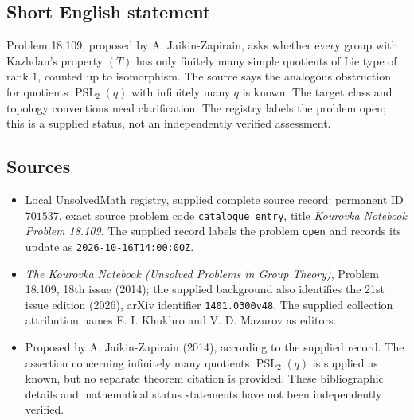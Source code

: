 \documentclass[11pt]{article}
\begin{document}
\subsection{Short English statement}
Problem 18.109, proposed by A. Jaikin-Zapirain, asks whether every group with Kazhdan's property \((T)\) has only finitely many simple quotients of Lie type of rank \(1\), counted up to isomorphism. The source says the analogous obstruction for quotients \(\operatorname{PSL}_2(q)\) with infinitely many \(q\) is known. The target class and topology conventions need clarification. The registry labels the problem open; this is a supplied status, not an independently verified assessment.
\subsection{Sources}
\begin{itemize}
\item Local UnsolvedMath registry, supplied complete source record: permanent ID \(701537\), exact source problem code \texttt{catalogue entry}, title \emph{Kourovka Notebook Problem 18.109}. The supplied record labels the problem \texttt{open} and records its update as \texttt{2026-10-16T14:00:00Z}.
\item \emph{The Kourovka Notebook (Unsolved Problems in Group Theory)}, Problem 18.109, 18th issue (2014); the supplied background also identifies the 21st issue edition (2026), arXiv identifier \texttt{1401.0300v48}. The supplied collection attribution names E. I. Khukhro and V. D. Mazurov as editors.
\item Proposed by A. Jaikin-Zapirain (2014), according to the supplied record. The assertion concerning infinitely many quotients \(\operatorname{PSL}_2(q)\) is supplied as known, but no separate theorem citation is provided. These bibliographic details and mathematical status statements have not been independently verified.
\end{itemize}
\end{document}
